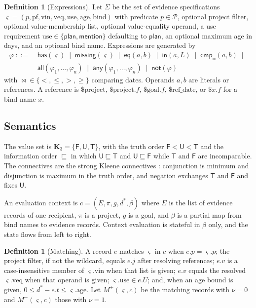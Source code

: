 \documentclass[11pt]{article}
\theoremstyle{definition}
\newtheorem{definition}[theorem]{Definition}
\theoremstyle{remark}
\newcommand{\Kt}{\mathbf{K}_3}
\newcommand{\vT}{\mathsf{T}}
\newcommand{\vU}{\mathsf{U}}
\newcommand{\vF}{\mathsf{F}}
\newcommand{\mention}{\mathsf{mention}}
\newcommand{\planuse}{\mathsf{plan}}
\begin{document}
\begin{definition}[Expressions]\label{def:expr}
Let $\Sigma$ be the set of evidence specifications $\varsigma=(p,\mathrm{pf},\mathrm{vin},\mathrm{veq},\mathrm{use},\mathrm{age},\mathrm{bind})$ with predicate $p\in\mathcal{P}$, optional project filter, optional value-membership list, optional value-equality operand, a use requirement $\mathrm{use}\in\{\planuse,\mention\}$ defaulting to $\planuse$, an optional maximum age in days, and an optional bind name. Expressions are generated by
\[
\begin{aligned}\varphi\;::=\;{}&\mathsf{has}(\varsigma)\;\mid\;\mathsf{missing}(\varsigma)\;\mid\;\mathsf{eq}(a,b)\;\mid\;\mathsf{in}(a,L)\;\mid\;\mathsf{cmp}_{\bowtie}(a,b)\;\mid\;\\&\mathsf{all}(\varphi_1,\dots,\varphi_n)\;\mid\;\mathsf{any}(\varphi_1,\dots,\varphi_n)\;\mid\;\mathsf{not}(\varphi)\end{aligned}
\]
with ${\bowtie}\in\{<,\le,>,\ge\}$ comparing dates. Operands $a,b$ are literals or references. A reference is $\$\mathrm{project}$, $\$\mathrm{project}.f$, $\$\mathrm{goal}.f$, $\$\mathrm{ref\_date}$, or $\$x.f$ for a bind name $x$.
\end{definition}

\subsection{Semantics}

The value set is $\Kt=\{\vF,\vU,\vT\}$, with the truth order $\vF<\vU<\vT$ and the information order $\sqsubseteq$ in which $\vU\sqsubseteq\vT$ and $\vU\sqsubseteq\vF$ while $\vT$ and $\vF$ are incomparable. The connectives are the strong Kleene connectives \cite{kleene1952}: conjunction is minimum and disjunction is maximum in the truth order, and negation exchanges $\vT$ and $\vF$ and fixes $\vU$.

An evaluation context is $c=(E,\pi,g,d^\ast,\beta)$ where $E$ is the list of evidence records of one recipient, $\pi$ is a project, $g$ is a goal, and $\beta$ is a partial map from bind names to evidence records. Context evaluation is stateful in $\beta$ only, and the state flows from left to right.

\begin{definition}[Matching]
A record $e$ matches $\varsigma$ in $c$ when $e.p=\varsigma.p$; the project filter, if not the wildcard, equals $e.j$ after resolving references; $e.v$ is a case-insensitive member of $\varsigma.\mathrm{vin}$ when that list is given; $e.v$ equals the resolved $\varsigma.\mathrm{veq}$ when that operand is given; $\varsigma.\mathrm{use}\in e.U$; and, when an age bound is given, $0\le d^\ast-e.t\le\varsigma.\mathrm{age}$. Let $M^{+}(\varsigma,c)$ be the matching records with $\nu=0$ and $M^{-}(\varsigma,c)$ those with $\nu=1$.
\end{definition}
\end{document}
